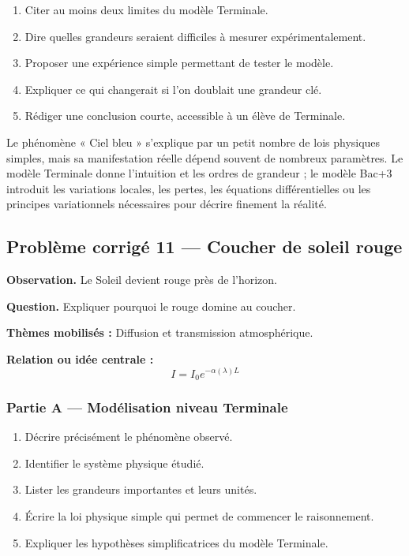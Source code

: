 \documentclass[11pt,a4paper]{article}
\begin{document}
\begin{enumerate}
  \item Citer au moins deux limites du modèle Terminale.
  \item Dire quelles grandeurs seraient difficiles à mesurer expérimentalement.
  \item Proposer une expérience simple permettant de tester le modèle.
  \item Expliquer ce qui changerait si l'on doublait une grandeur clé.
  \item Rédiger une conclusion courte, accessible à un élève de Terminale.
\end{enumerate}

\begin{corrigebox}
Le phénomène « Ciel bleu » s'explique par un petit nombre de lois physiques simples, mais sa manifestation réelle dépend souvent de nombreux paramètres. Le modèle Terminale donne l'intuition et les ordres de grandeur ; le modèle Bac+3 introduit les variations locales, les pertes, les équations différentielles ou les principes variationnels nécessaires pour décrire finement la réalité.
\end{corrigebox}

\subsection{Problème corrigé 11 — Coucher de soleil rouge}

\begin{exercicebox}
\textbf{Observation.} Le Soleil devient rouge près de l'horizon.

\medskip
\textbf{Question.} Expliquer pourquoi le rouge domine au coucher.

\medskip
\textbf{Thèmes mobilisés :} Diffusion et transmission atmosphérique.

\medskip
\textbf{Relation ou idée centrale :}
\[
I=I_0e^{-\alpha(\lambda)L}
\]
\end{exercicebox}

\subsubsection*{Partie A — Modélisation niveau Terminale}

\begin{enumerate}
  \item Décrire précisément le phénomène observé.
  \item Identifier le système physique étudié.
  \item Lister les grandeurs importantes et leurs unités.
  \item Écrire la loi physique simple qui permet de commencer le raisonnement.
  \item Expliquer les hypothèses simplificatrices du modèle Terminale.
\end{enumerate}
\end{document}
